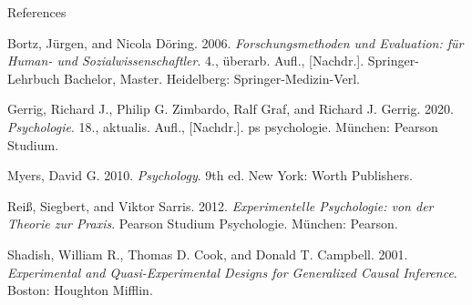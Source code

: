 \documentclass[
  8pt,
  ignorenonframetext,
]{beamer}
\newlength{\cslhangindent}
\newlength{\cslentryspacingunit} %
\newenvironment{CSLReferences}[2] %
 {%
  \setlength{\parindent}{0pt}
  \ifodd #1
  \let\oldpar\par
  \def\par{\hangindent=\cslhangindent\oldpar}
  \fi
  \setlength{\parskip}{#2\cslentryspacingunit}
 }%
 {}
\begin{document}
\begin{frame}{References}
\protect\hypertarget{references}{}
\footnotesize

\hypertarget{refs}{}
\begin{CSLReferences}{1}{0}
\leavevmode{}%
Bortz, Jürgen, and Nicola Döring. 2006. \emph{{Forschungsmethoden und
Evaluation: für Human- und Sozialwissenschaftler}}. 4., überarb. Aufl.,
{[}Nachdr.{]}. {Springer-Lehrbuch Bachelor, Master}. {Heidelberg}:
{Springer-Medizin-Verl}.

\leavevmode{}%
Gerrig, Richard J., Philip G. Zimbardo, Ralf Graf, and Richard J.
Gerrig. 2020. \emph{{Psychologie}}. 18., aktualis. Aufl., {[}Nachdr.{]}.
{ps psychologie}. {München}: {Pearson Studium}.

\leavevmode{}%
Myers, David G. 2010. \emph{Psychology}. 9th ed. {New York}: {Worth
Publishers}.

\leavevmode{}%
Reiß, Siegbert, and Viktor Sarris. 2012. \emph{{Experimentelle
Psychologie: von der Theorie zur Praxis}}. {Pearson Studium
Psychologie}. {München}: {Pearson}.

\leavevmode{}%
Shadish, William R., Thomas D. Cook, and Donald T. Campbell. 2001.
\emph{Experimental and Quasi-Experimental Designs for Generalized Causal
Inference}. {Boston}: {Houghton Mifflin}.

\end{CSLReferences}
\end{frame}
\end{document}
